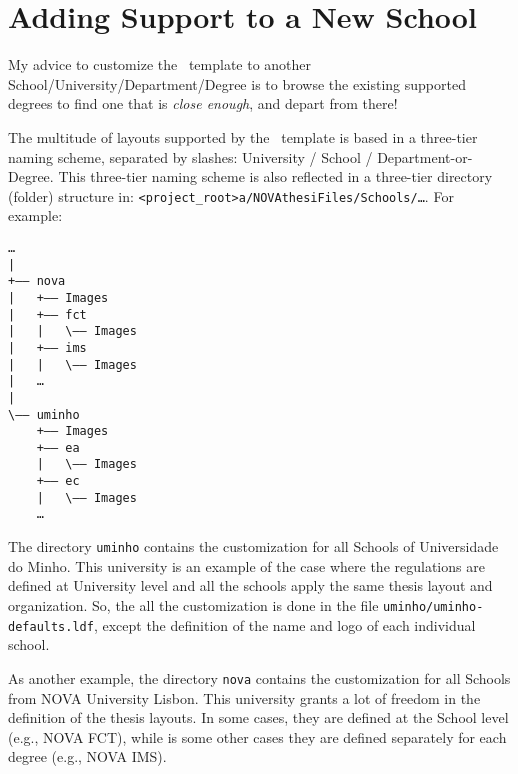 
%

\chapter{Adding Support to a New School}
\label{cha:porting_novathesis}

My advice to customize the \novathesis\ template to another School/University/Department/Degree is to browse the existing supported degrees to find one that is \emph{close enough}, and depart from there!

The multitude of layouts supported by the \novathesis\ template is based in a three-tier naming scheme, separated by slashes: University / School / Department-or-Degree.  This three-tier naming scheme is also reflected in a three-tier directory (folder) structure in: \verb!<project_root>a/NOVAthesiFiles/Schools/…!.  For example:

\begin{verbatim}
…
| 
+—— nova
|   +—— Images
|   +—— fct
|   |   \—— Images
|   +—— ims
|   |   \—— Images
|   …
|   
\—— uminho
    +—— Images
    +—— ea
    |   \—— Images
    +—— ec
    |   \—— Images
    …
\end{verbatim}

The directory \verb!uminho! contains the customization for all Schools of Universidade do Minho.  This university is an example of the case where the regulations are defined at University level and all the schools apply the same thesis layout and organization.  So, the all the customization is done in the file \verb!uminho/uminho-defaults.ldf!, except the definition of the name and logo of each individual school.

As another example, the directory \verb!nova! contains the customization for all Schools from NOVA University Lisbon. This university grants a lot of freedom in the definition of the thesis layouts.  In some cases, they are defined at the School level (e.g., NOVA FCT), while is some other cases they are defined separately for each degree (e.g., NOVA IMS).




